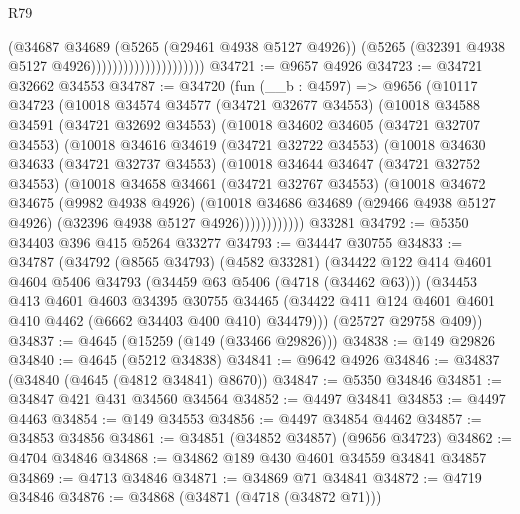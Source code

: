 \begin{lexlean}{R79}
\begin{coremodule}
                                        (@34687
                                          @34689
                                          (@5265 (@29461 @4938 @5127 @4926))
                                          (@5265 (@32391 @4938 @5127 @4926)))))))))))))))))))))
@34721 := @9657 @4926
@34723 := @34721 @32662 @34553
@34787 := @34720
    (fun (__b : @4597) =>
    @9656
      (@10117
        @34723
        (@10018
          @34574
          @34577
          (@34721 @32677 @34553)
          (@10018
            @34588
            @34591
            (@34721 @32692 @34553)
            (@10018
              @34602
              @34605
              (@34721 @32707 @34553)
              (@10018
                @34616
                @34619
                (@34721 @32722 @34553)
                (@10018
                  @34630
                  @34633
                  (@34721 @32737 @34553)
                  (@10018
                    @34644
                    @34647
                    (@34721 @32752 @34553)
                    (@10018
                      @34658
                      @34661
                      (@34721 @32767 @34553)
                      (@10018
                        @34672
                        @34675
                        (@9982 @4938 @4926)
                        (@10018
                          @34686
                          @34689
                          (@29466 @4938 @5127 @4926)
                          (@32396 @4938 @5127 @4926))))))))))))
    @33281
@34792 := @5350 @34403 @396 @415 @5264 @33277
@34793 := @34447 @30755
@34833 := @34787
    (@34792
      (@8565 @34793)
      (@4582 @33281)
      (@34422
        @122
        @414
        @4601
        @4604
        @5406
        @34793
        (@34459 @63 @5406 (@4718 (@34462 @63)))
        (@34453
          @413
          @4601
          @4603
          @34395
          @30755
          @34465
          (@34422 @411 @124 @4601 @4601 @410 @4462 (@6662 @34403 @400 @410) @34479)))
      (@25727 @29758 @409))
@34837 := @4645 (@15259 (@149 (@33466 @29826)))
@34838 := @149 @29826
@34840 := @4645 (@5212 @34838)
@34841 := @9642 @4926
@34846 := @34837 (@34840 (@4645 (@4812 @34841) @8670))
@34847 := @5350 @34846
@34851 := @34847 @421 @431 @34560 @34564
@34852 := @4497 @34841
@34853 := @4497 @4463
@34854 := @149 @34553
@34856 := @4497 @34854 @4462
@34857 := @34853 @34856
@34861 := @34851 (@34852 @34857) (@9656 @34723)
@34862 := @4704 @34846
@34868 := @34862 @189 @430 @4601 @34559 @34841 @34857
@34869 := @4713 @34846
@34871 := @34869 @71 @34841
@34872 := @4719 @34846
@34876 := @34868 (@34871 (@4718 (@34872 @71)))

\end{coremodule}
\end{lexlean}
